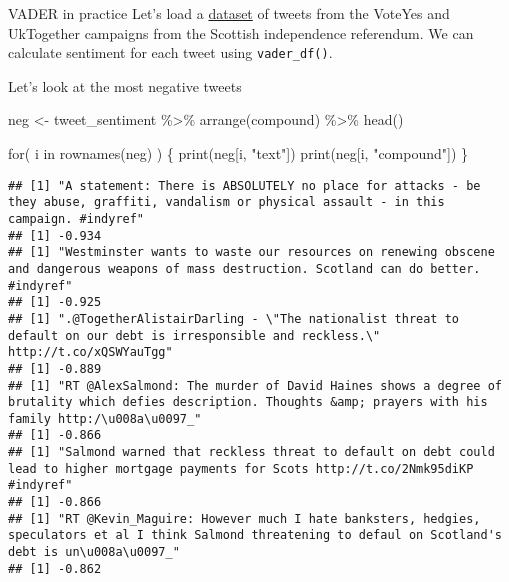 \documentclass[
  10pt,
  ignorenonframetext,
  aspectratio=169]{beamer}
\newenvironment{Shaded}{\begin{snugshade}}{\end{snugshade}}
\newcommand{\ControlFlowTok}[1]{\textcolor[rgb]{0.94,0.87,0.69}{#1}}
\newcommand{\FunctionTok}[1]{\textcolor[rgb]{0.94,0.94,0.56}{#1}}
\newcommand{\NormalTok}[1]{\textcolor[rgb]{0.80,0.80,0.80}{#1}}
\newcommand{\OtherTok}[1]{\textcolor[rgb]{0.94,0.94,0.56}{#1}}
\newcommand{\SpecialCharTok}[1]{\textcolor[rgb]{0.86,0.64,0.64}{#1}}
\newcommand{\StringTok}[1]{\textcolor[rgb]{0.80,0.58,0.58}{#1}}
\begin{document}
\begin{frame}[fragile]{VADER in practice}
\protect\hypertarget{vader-in-practice-1}{}
Let's load a \href{https://doi.org/10.7910/DVN/RQ7P1F}{dataset} of
tweets from the VoteYes and UkTogether campaigns from the Scottish
independence referendum. We can calculate sentiment for each tweet using
\texttt{vader\_df()}.

Let's look at the most negative tweets

\medskip
\scriptsize

\begin{Shaded}
\begin{Highlighting}[]
\NormalTok{neg }\OtherTok{\textless{}{-}}\NormalTok{ tweet\_sentiment }\SpecialCharTok{\%\textgreater{}\%} \FunctionTok{arrange}\NormalTok{(compound) }\SpecialCharTok{\%\textgreater{}\%} 
  \FunctionTok{head}\NormalTok{()}

\ControlFlowTok{for}\NormalTok{( i }\ControlFlowTok{in} \FunctionTok{rownames}\NormalTok{(neg) ) \{}
  \FunctionTok{print}\NormalTok{(neg[i, }\StringTok{"text"}\NormalTok{])}
  \FunctionTok{print}\NormalTok{(neg[i, }\StringTok{"compound"}\NormalTok{])}
\NormalTok{\}}
\end{Highlighting}
\end{Shaded}

\begin{verbatim}
## [1] "A statement: There is ABSOLUTELY no place for attacks - be they abuse, graffiti, vandalism or physical assault - in this campaign. #indyref"
## [1] -0.934
## [1] "Westminster wants to waste our resources on renewing obscene and dangerous weapons of mass destruction. Scotland can do better. #indyref"
## [1] -0.925
## [1] ".@TogetherAlistairDarling - \"The nationalist threat to default on our debt is irresponsible and reckless.\" http://t.co/xQSWYauTgg"
## [1] -0.889
## [1] "RT @AlexSalmond: The murder of David Haines shows a degree of brutality which defies description. Thoughts &amp; prayers with his family http:/\u008a\u0097_"
## [1] -0.866
## [1] "Salmond warned that reckless threat to default on debt could lead to higher mortgage payments for Scots http://t.co/2Nmk95diKP #indyref"
## [1] -0.866
## [1] "RT @Kevin_Maguire: However much I hate banksters, hedgies, speculators et al I think Salmond threatening to defaul on Scotland's debt is un\u008a\u0097_"
## [1] -0.862
\end{verbatim}
\end{frame}
\end{document}
